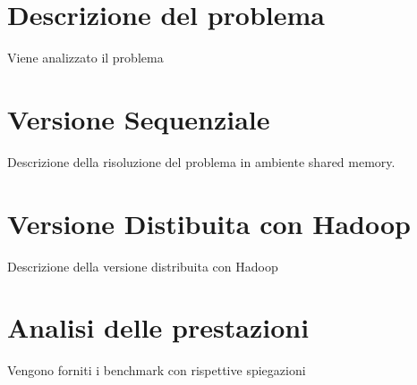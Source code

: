 \section{Descrizione del problema}
Viene analizzato il problema
\section{Versione Sequenziale}
Descrizione della risoluzione del problema in ambiente shared memory.
\section{Versione Distibuita con Hadoop}
Descrizione della versione distribuita con Hadoop
\section{Analisi delle prestazioni}
Vengono forniti i benchmark con rispettive spiegazioni
